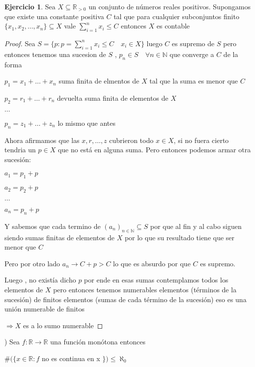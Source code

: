 \documentclass[12pt]{article}
\newcommand{\n}{\aleph_{0}}
\newcommand{\R}{\mathbb{R}}
\newcommand{\N}{\mathbb{N}}
\newcommand{\Ra}{\Rightarrow}
\newcommand{\ra}{\rightarrow}
\theoremstyle{definition}
\newtheorem{ej}{Ejercicio}
\begin{document}
\begin{ej} Sea $X \subseteq \R_{ >0 }$ un conjunto de números reales positivos. Supongamos que existe una constante positiva $C$ tal que para cualquier subconjuntos finito $\{x_{1},x_{2}, \dots ,x_{n}\} \subseteq X$ vale $\sum_{i =1}^{n} x_{i} \leq C$ entonces $X$ es contable

\begin{proof}
  Sea $S = \{p : p = \sum_{i = 1}^{n} x_{i} \leq C \quad x_{i} \in X\}$ luego $C$ es supremo de $S$ pero entonces tenemos una sucesion de $S$ , $p_{n} \in S \quad \forall n \in \N$ que converge a $C$ de la forma

  $p_{1} = x_{1} + \dots + x_{n}$ suma finita de elmentos de $X$ tal que la suma es menor que $C$

  $p_{2} = r_{1} + \dots + r_{n} $ devuelta suma finita de elementos de $X$

  $\dots$

  $p_{n} = z_{1} + \dots + z_{n}$ lo mismo que antes

  Ahora afirmamos que las $x,r, \dots ,z $ cubrieron todo $x \in X$, si no fuera cierto tendria un $p \in X $ que no está en alguna suma. Pero entonces podemos armar otra sucesión: 
  
  $a_{1} = p_{1} + p$
  
  $a_{2}=   p_{2}+p$
  
  $\dots$
  
  $a_{n} = p_{n} + p$

  Y sabemos que cada termino de $(a_{n})_{n \in \N} \subseteq S$ por que al fin y al cabo siguen siendo sumas finitas de elementos de $X$ por lo que su resultado tiene que ser menor que $C$

  Pero por otro lado $a_{n} \ra C + p > C$ lo que es absurdo por que $C$ es supremo. 

  Luego , no existía dicho $p$ por ende en esas sumas contemplamos todos los elementos de $X$ pero entonces tenemos numerables elementos (términos de la sucesión) de finitos elementos (sumas de cada término de la sucesión) eso es una unión numerable de finitos 

  $\Ra X$ es a lo sumo numerable

\end{proof}
\end{ej}
) Sea $f: \R \ra \R$ una función monótona entonces 
\begin{center} 
  $\# (\{x \in \R :f $ no es continua en x $\}) \leq \n$
\end{center}
\end{document}
